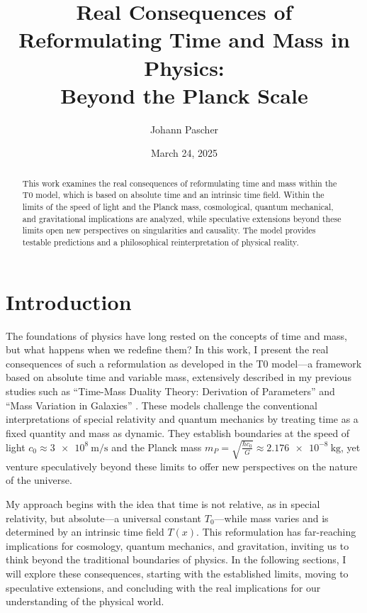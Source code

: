 \documentclass[a4paper,12pt]{article}
\title{Real Consequences of Reformulating Time and Mass in Physics: \\Beyond the Planck Scale}
\author{Johann Pascher}
\date{March 24, 2025}
\newcommand{\Tfield}{T(x)}
\begin{document}
	
	\maketitle
	
	\begin{abstract}
		This work examines the real consequences of reformulating time and mass within the T0 model, which is based on absolute time and an intrinsic time field. Within the limits of the speed of light and the Planck mass, cosmological, quantum mechanical, and gravitational implications are analyzed, while speculative extensions beyond these limits open new perspectives on singularities and causality. The model provides testable predictions and a philosophical reinterpretation of physical reality.
	\end{abstract}
	
	\tableofcontents
	\newpage
	
	\section{Introduction}
	
	The foundations of physics have long rested on the concepts of time and mass, but what happens when we redefine them? In this work, I present the real consequences of such a reformulation as developed in the T0 model—a framework based on absolute time and variable mass, extensively described in my previous studies such as “Time-Mass Duality Theory: Derivation of Parameters” \cite{pascher_params_2025} and “Mass Variation in Galaxies” \cite{pascher_galaxies_2025}. These models challenge the conventional interpretations of special relativity and quantum mechanics by treating time as a fixed quantity and mass as dynamic. They establish boundaries at the speed of light \(c_0 \approx \SI{3e8}{\meter\per\second}\) and the Planck mass \(m_P = \sqrt{\frac{\hbar c_0}{G}} \approx \SI{2.176e-8}{\kilo\gram}\), yet venture speculatively beyond these limits to offer new perspectives on the nature of the universe.
	
	My approach begins with the idea that time is not relative, as in special relativity, but absolute—a universal constant \(T_0\)—while mass varies and is determined by an intrinsic time field \(\Tfield\). This reformulation has far-reaching implications for cosmology, quantum mechanics, and gravitation, inviting us to think beyond the traditional boundaries of physics. In the following sections, I will explore these consequences, starting with the established limits, moving to speculative extensions, and concluding with the real implications for our understanding of the physical world.
	
\end{document}

